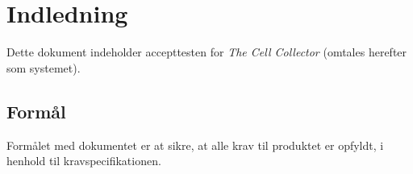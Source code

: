 \section{Indledning}
Dette dokument indeholder accepttesten for \textit{The Cell Collector} (omtales herefter som systemet). 

\subsection{Formål}
Formålet med dokumentet er at sikre, at alle krav til produktet er opfyldt, i henhold til kravspecifikationen.
